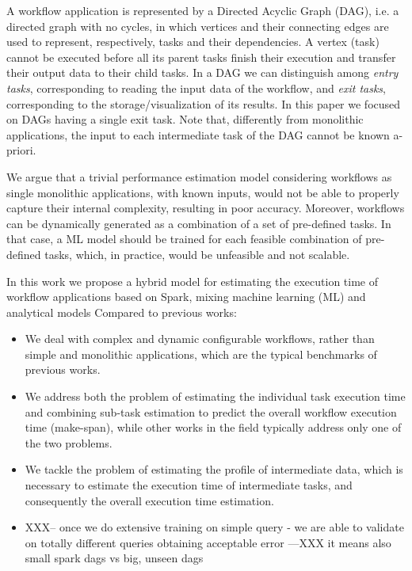 \documentclass[a4paper, 10pt, conference]{ieeeconf}      %
\begin{document}
A workflow application is  represented by a Directed Acyclic Graph (DAG), i.e. a directed graph with no cycles, in which vertices and their connecting edges are used to represent, respectively,  tasks and their dependencies. A vertex (task) cannot be executed before all its parent tasks finish their execution and transfer their output data to their child tasks.
In a DAG we can distinguish among \textit{entry tasks}, corresponding to reading the input data of the workflow, and  \textit{exit tasks}, corresponding to the storage/visualization of its results. \color{blue}In this paper we focused on DAGs having a single exit task. \color{black}
Note that, differently from monolithic applications,  the input to each intermediate task of the DAG cannot be known a-priori.

We argue that a trivial performance estimation model considering workflows as single monolithic applications, with known inputs, would not be able to properly capture their internal complexity, resulting in poor accuracy.
Moreover, workflows can be dynamically generated as a combination of a set of pre-defined tasks. In that case, a ML model should be trained for each feasible combination of pre-defined tasks, which, in practice, would be unfeasible and not scalable.

In this work we propose a hybrid model for estimating the execution time of workflow applications based on Spark, mixing machine learning (ML) and analytical models %
Compared to previous works:
\begin{itemize}
    \item  We deal with complex and dynamic configurable workflows, rather than simple and monolithic applications, which are the typical benchmarks of previous works.
    \item We address both the problem of estimating the individual task execution time and combining sub-task estimation to predict the overall workflow execution time (make-span), while other works in the field typically address only one of the two problems.
    \item We tackle the problem of estimating the profile of intermediate data, which is necessary to estimate the execution time of intermediate tasks, and consequently the overall execution time estimation.
    \item XXX-- once we do extensive training on simple query - we are able to validate on totally different queries obtaining acceptable error ---XXX it means also small spark dags vs big, unseen dags
\end{itemize}
\end{document}
